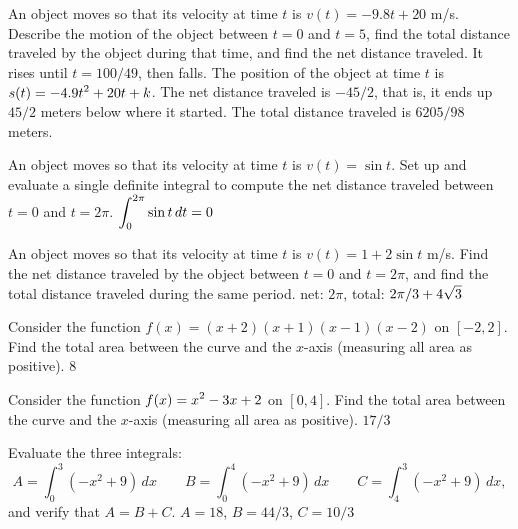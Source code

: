 \exercises

\exercise An object moves so that its velocity at time $t$ is
$v(t)=-9.8t+20$ m/s. Describe the motion of the object between $t=0$ and
$t=5$, find the total distance traveled by the object during that
time, and find the net distance traveled.
\answer It rises until $t=100/49$, then falls. The position of the
object at time $t$ is $\displaystyle s(t)=-4.9t^2+20t+k$. The net distance traveled
is $-45/2$, that is, it ends up $45/2$ meters below where it started.
The total distance traveled is $6205/98$ meters. 
\endanswer
\endexercise

\exercise An object moves so that its velocity at time $t$ is $v(t)=\sin t$.
Set up and evaluate a single definite integral to compute the
net distance traveled between $t=0$ and $t=2\pi$.
\answer $\displaystyle\int_0^{2\pi}\sin t\,dt=0$
\endanswer
\endexercise

\exercise An object moves so that its velocity at time $t$ is
$v(t)=1+2\sin t$ m/s. Find the net distance traveled by the object
between $t=0$ and $t=2\pi$, and find the total distance traveled
during the same period.
\answer net: $2\pi$, total: $\displaystyle 2\pi/3+4\sqrt3$ 
\endanswer
\endexercise

\exercise Consider the function $f(x)=(x+2)(x+1)(x-1)(x-2)$ on
$[-2,2]$. Find the total area between the curve and the $x$-axis
(measuring all area as positive).
\answer $8$
\endanswer
\endexercise

\exercise Consider the function $\displaystyle f(x)=x^2-3x+2$ on
$[0,4]$. Find the total area between the curve and the $x$-axis
(measuring all area as positive).
\answer $17/3$
\endanswer
\endexercise

\exercise Evaluate the three integrals:
$$
  A=\int_0^3 (-x^2+9)\,dx\qquad B=\int_0^{4} (-x^2+9)\,dx\qquad 
  C=\int_{4}^3 (-x^2+9)\,dx,
$$
and verify that $A=B+C$.
\answer $A=18$, $B=44/3$, $C=10/3$
\endanswer
\endexercise

\endexercises

